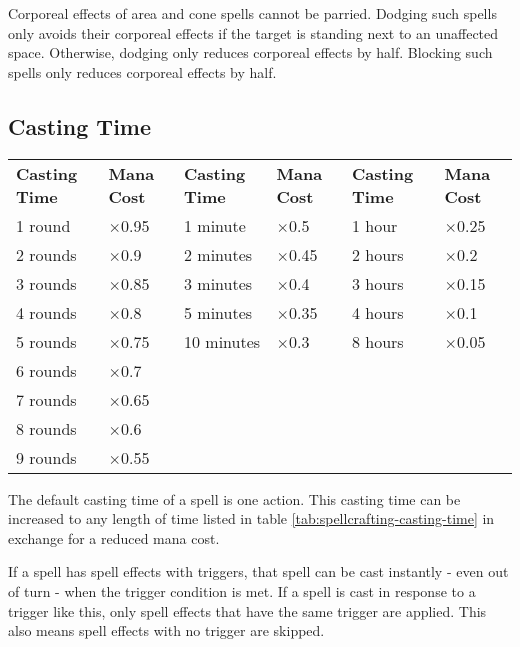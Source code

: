     Corporeal effects of area and cone spells cannot be parried. Dodging such
    spells only avoids their corporeal effects if the target is standing next
    to an unaffected space. Otherwise, dodging only reduces corporeal effects
    by half. Blocking such spells only reduces corporeal effects by half.

    \subsection{Casting Time}
    \begin{table*}[ht]
        \unclassedrowcolors
        \begin{tabularx}{\textwidth}{l X l X l X}
            \textbf{Casting Time} & \textbf{Mana Cost} & \textbf{Casting Time} & \textbf{Mana Cost} & \textbf{Casting Time} & \textbf{Mana Cost} \\
            1 round  & $\times$0.95 & 1 minute   & $\times$0.5  & 1 hour  & $\times$0.25 \\
            2 rounds & $\times$0.9  & 2 minutes  & $\times$0.45 & 2 hours & $\times$0.2  \\
            3 rounds & $\times$0.85 & 3 minutes  & $\times$0.4  & 3 hours & $\times$0.15 \\
            4 rounds & $\times$0.8  & 5 minutes  & $\times$0.35 & 4 hours & $\times$0.1  \\
            5 rounds & $\times$0.75 & 10 minutes & $\times$0.3  & 8 hours & $\times$0.05 \\
            6 rounds & $\times$0.7  & & & & \\
            7 rounds & $\times$0.65 & & & & \\
            8 rounds & $\times$0.6  & & & & \\
            9 rounds & $\times$0.55 & & & & \\
        \end{tabularx}
        \caption{Spellcrafting Casting Time}
        \label{tab:spellcrafting-casting-time}
    \end{table*}
    The default casting time of a spell is one action. This casting time
    can be increased to any length of time listed in table
    \ref{tab:spellcrafting-casting-time} in exchange for a reduced mana cost.

    If a spell has spell effects with triggers, that spell can be cast
    instantly - even out of turn - when the trigger condition is met. If a
    spell is cast in response to a trigger like this, only spell effects
    that have the same trigger are applied. This also means spell effects
    with no trigger are skipped.

